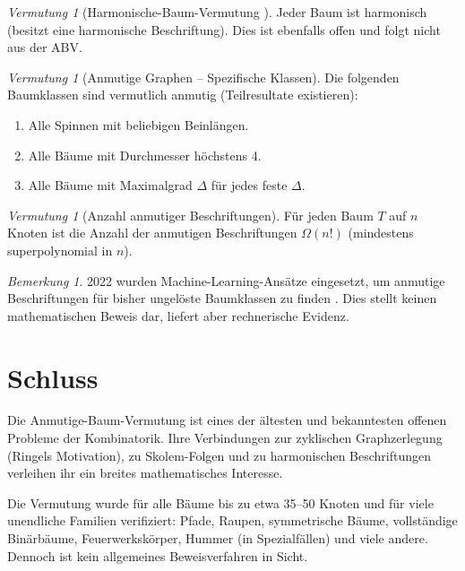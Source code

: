 \documentclass[12pt,a4paper]{amsart}
\theoremstyle{definition}
\theoremstyle{remark}
\newtheorem{vermutung}[theorem]{Vermutung}
\newtheorem{bemerkung}[theorem]{Bemerkung}
\begin{document}
\begin{vermutung}[Harmonische-Baum-Vermutung \cite{GrahamSloane1980}]\label{verm:harm}
Jeder Baum ist harmonisch (besitzt eine harmonische Beschriftung). Dies ist
ebenfalls offen und folgt nicht aus der ABV.
\end{vermutung}

\begin{vermutung}[Anmutige Graphen -- Spezifische Klassen]\label{verm:klassen}
Die folgenden Baumklassen sind vermutlich anmutig (Teilresultate existieren):
\begin{enumerate}[label=(\roman*)]
  \item Alle Spinnen mit beliebigen Beinlängen.
  \item Alle Bäume mit Durchmesser höchstens 4.
  \item Alle Bäume mit Maximalgrad $\Delta$ für jedes feste $\Delta$.
\end{enumerate}
\end{vermutung}

\begin{vermutung}[Anzahl anmutiger Beschriftungen]\label{verm:anzahl}
Für jeden Baum $T$ auf $n$ Knoten ist die Anzahl der anmutigen Beschriftungen
$\Omega(n!)$ (mindestens superpolynomial in $n$).
\end{vermutung}

\begin{bemerkung}
2022 wurden Machine-Learning-Ansätze eingesetzt, um anmutige Beschriftungen für
bisher ungelöste Baumklassen zu finden \cite{Cappart2022}. Dies stellt keinen
mathematischen Beweis dar, liefert aber rechnerische Evidenz.
\end{bemerkung}

\section{Schluss}

Die Anmutige-Baum-Vermutung ist eines der ältesten und bekanntesten offenen Probleme
der Kombinatorik. Ihre Verbindungen zur zyklischen Graphzerlegung (Ringels Motivation),
zu Skolem-Folgen und zu harmonischen Beschriftungen verleihen ihr ein breites
mathematisches Interesse.

Die Vermutung wurde für alle Bäume bis zu etwa 35--50 Knoten und für viele unendliche
Familien verifiziert: Pfade, Raupen, symmetrische Bäume, vollständige Binärbäume,
Feuerwerkskörper, Hummer (in Spezialfällen) und viele andere. Dennoch ist kein
allgemeines Beweisverfahren in Sicht.
\end{document}
